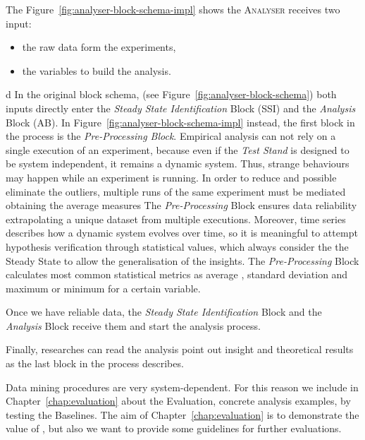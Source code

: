 The Figure~\ref{fig:analyser-block-schema-impl} shows the \textsc{Analyser} receives two input:
\begin{itemize}
\item the raw data form the experiments,
\item the variables to build the analysis.
\end{itemize}
 d
In the original block schema, (see Figure~\ref{fig:analyser-block-schema}) both inputs directly enter the \textit{Steady State Identification} Block (SSI) and the \textit{Analysis} Block (AB). In Figure~\ref{fig:analyser-block-schema-impl}   instead, the first block in the process is the \textit{Pre-Processing Block}. Empirical analysis can not rely on a single execution of an experiment, because even if the \textit{Test Stand} is designed to be system independent, it remains a dynamic system. Thus, strange behaviours may happen while an experiment is running. In order to reduce and possible eliminate the outliers, multiple runs of the same experiment must be mediated obtaining the average measures The \textit{Pre-Processing} Block ensures data reliability extrapolating a unique dataset from multiple executions. Moreover, time series describes how a dynamic system evolves over time, so it is meaningful to attempt hypothesis verification through statistical values, which always consider the the Steady State to allow the generalisation of the insights. The \textit{Pre-Processing} Block calculates most common statistical metrics as average , standard deviation and maximum or minimum for a certain variable.


Once we have reliable data, the \textit{Steady State Identification} Block and the \textit{Analysis} Block receive them and start the analysis process. 

Finally, researches can read the analysis point out insight and theoretical results as the last block in the process describes.

Data mining procedures are very system-dependent. For this reason we include in Chapter~\ref{chap:evaluation} about the \name Evaluation, concrete analysis examples, by testing the Baselines. The aim of Chapter~\ref{chap:evaluation} is to demonstrate the value of \namens, but also we want to provide some guidelines for further evaluations.

